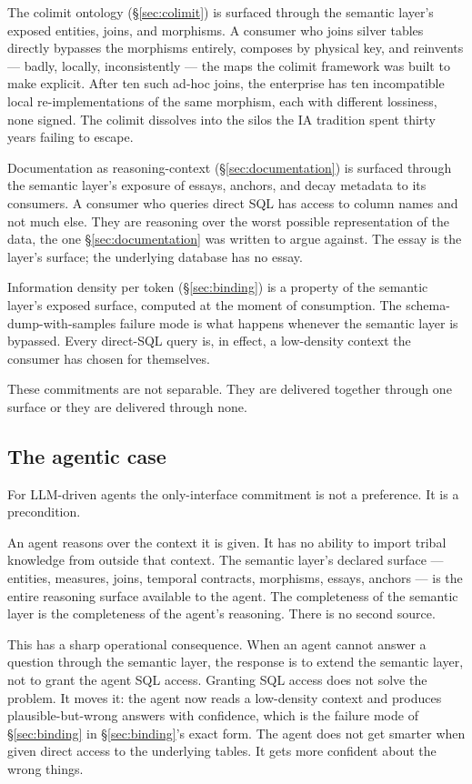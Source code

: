 \documentclass[11pt,a4paper]{article}
\begin{document}
The colimit ontology (\S\ref{sec:colimit}) is surfaced through the semantic layer's exposed entities, joins, and morphisms. A consumer who joins silver tables directly bypasses the morphisms entirely, composes by physical key, and reinvents --- badly, locally, inconsistently --- the maps the colimit framework was built to make explicit. After ten such ad-hoc joins, the enterprise has ten incompatible local re-implementations of the same morphism, each with different lossiness, none signed. The colimit dissolves into the silos the IA tradition spent thirty years failing to escape.

Documentation as reasoning-context (\S\ref{sec:documentation}) is surfaced through the semantic layer's exposure of essays, anchors, and decay metadata to its consumers. A consumer who queries direct SQL has access to column names and not much else. They are reasoning over the worst possible representation of the data, the one \S\ref{sec:documentation} was written to argue against. The essay is the layer's surface; the underlying database has no essay.

Information density per token (\S\ref{sec:binding}) is a property of the semantic layer's exposed surface, computed at the moment of consumption. The schema-dump-with-samples failure mode is what happens whenever the semantic layer is bypassed. Every direct-SQL query is, in effect, a low-density context the consumer has chosen for themselves.

These commitments are not separable. They are delivered together through one surface or they are delivered through none.

\subsection{The agentic case}

For LLM-driven agents the only-interface commitment is not a preference. It is a precondition.

An agent reasons over the context it is given. It has no ability to import tribal knowledge from outside that context. The semantic layer's declared surface --- entities, measures, joins, temporal contracts, morphisms, essays, anchors --- is the entire reasoning surface available to the agent. The completeness of the semantic layer is the completeness of the agent's reasoning. There is no second source.

This has a sharp operational consequence. When an agent cannot answer a question through the semantic layer, the response is to extend the semantic layer, not to grant the agent SQL access. Granting SQL access does not solve the problem. It moves it: the agent now reads a low-density context and produces plausible-but-wrong answers with confidence, which is the failure mode of \S\ref{sec:binding} in \S\ref{sec:binding}'s exact form. The agent does not get smarter when given direct access to the underlying tables. It gets more confident about the wrong things.
\end{document}
